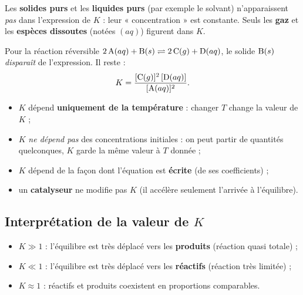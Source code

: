 \documentclass[11pt,a4paper]{article}
\begin{document}
\begin{attention}
Les \textbf{solides purs} et les \textbf{liquides purs} (par exemple le solvant) n'apparaissent
\emph{pas} dans l'expression de $K$ : leur « concentration » est constante. Seuls les \textbf{gaz} et les
\textbf{espèces dissoutes} (notées $(aq)$) figurent dans $K$.
\end{attention}

\begin{exemple}
Pour la réaction réversible \;$2\,\ce{A}(aq) + \ce{B}(s) \rightleftharpoons 2\,\ce{C}(g) + \ce{D}(aq)$\;,
le solide $\ce{B}(s)$ \emph{disparaît} de l'expression. Il reste :
\[ K = \frac{[\ce{C}(g)]^{2}\,[\ce{D}(aq)]}{[\ce{A}(aq)]^{2}}. \]
\end{exemple}

\begin{theoreme}
\begin{itemize}[leftmargin=1.6em,topsep=2pt,itemsep=1.5pt]
  \item $K$ dépend \textbf{uniquement de la température} : changer $T$ change la valeur de $K$ ;
  \item $K$ \emph{ne dépend pas} des concentrations initiales : on peut partir de quantités quelconques,
        $K$ garde la même valeur à $T$ donnée ;
  \item $K$ dépend de la façon dont l'équation est \textbf{écrite} (de ses coefficients) ;
  \item un \textbf{catalyseur} ne modifie pas $K$ (il accélère seulement l'arrivée à l'équilibre).
\end{itemize}
\end{theoreme}

\subsection{Interprétation de la valeur de $K$}

\begin{itemize}[leftmargin=1.6em,topsep=2pt,itemsep=2pt]
  \item $K \gg 1$ : l'équilibre est très déplacé vers les \textbf{produits} (réaction quasi totale) ;
  \item $K \ll 1$ : l'équilibre est très déplacé vers les \textbf{réactifs} (réaction très limitée) ;
  \item $K \approx 1$ : réactifs et produits coexistent en proportions comparables.
\end{itemize}
\end{document}
